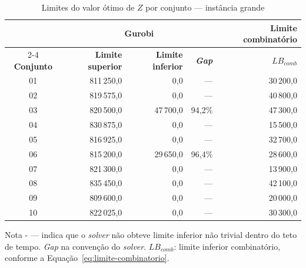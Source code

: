 \begin{table}[htbp]
    \caption{Limites do valor ótimo de $Z$ por conjunto --- instância grande}
    \label{tab:res-limites-grande}
    \centering
    \begin{tabular}{crrrr}
        \hline
        & \multicolumn{3}{c}{\textbf{Gurobi}} & \textbf{Limite combinatório} \\
        \cline{2-4} \cline{5-5}
        \textbf{Conjunto} & \textbf{Limite superior} & \textbf{Limite inferior} & \textbf{\textit{Gap}} & \textbf{$LB_{comb}$} \\
        \hline
        01 & 811\,250,0 & 0,0 & --- & 30\,200,0 \\
        02 & 819\,575,0 & 0,0 & --- & 40\,800,0 \\
        03 & 820\,500,0 & 47\,700,0 & 94,2\% & 47\,300,0 \\
        04 & 830\,875,0 & 0,0 & --- & 15\,500,0 \\
        05 & 816\,925,0 & 0,0 & --- & 32\,700,0 \\
        06 & 815\,200,0 & 29\,650,0 & 96,4\% & 28\,600,0 \\
        07 & 821\,300,0 & 0,0 & --- & 13\,900,0 \\
        08 & 835\,450,0 & 0,0 & --- & 42\,100,0 \\
        09 & 809\,600,0 & 0,0 & --- & 20\,000,0 \\
        10 & 822\,025,0 & 0,0 & --- & 30\,300,0 \\
        \hline
    \end{tabular}
    \par\smallskip
    {\footnotesize Nota - --- indica que o \textit{solver} não obteve limite inferior não trivial dentro do teto de tempo. \textit{Gap} na convenção do \textit{solver}. $LB_{comb}$: limite inferior combinatório, conforme a Equação~\eqref{eq:limite-combinatorio}.}
\end{table}

